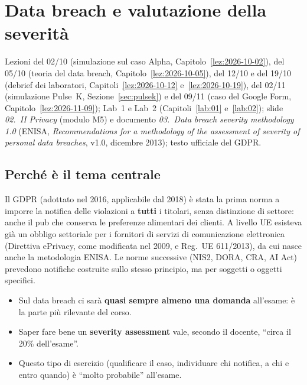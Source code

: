 \chapter{Data breach e valutazione della severità}
\label{cap:data-breach}

\begin{nota}[Fonti]
Lezioni del 02/10 (simulazione sul caso Alpha, Capitolo~\ref{lez:2026-10-02}), del 05/10 (teoria del
data breach, Capitolo~\ref{lez:2026-10-05}), del 12/10 e del 19/10 (debrief dei laboratori,
Capitoli~\ref{lez:2026-10-12} e~\ref{lez:2026-10-19}), del 02/11 (simulazione Pulse~K,
Sezione~\ref{sec:pulsek}) e del 09/11 (caso del Google Form, Capitolo~\ref{lez:2026-11-09}); Lab~1 e
Lab~2 (Capitoli~\ref{lab:01} e~\ref{lab:02}); slide \emph{02.~II Privacy} (modulo M5) e documento
\emph{03.~Data breach severity methodology 1.0} (ENISA, \emph{Recommendations for a methodology of the
assessment of severity of personal data breaches}, v1.0, dicembre 2013); testo ufficiale del GDPR.
\end{nota}

\section{Perché è il tema centrale}
\label{sec:breach-perche}

Il GDPR (adottato nel 2016, applicabile dal 2018) è stata la prima norma a imporre la notifica delle
violazioni a \textbf{tutti} i titolari, senza distinzione di settore: anche il pub che conserva le
preferenze alimentari dei clienti. A livello UE esisteva già un obbligo settoriale per i fornitori di
servizi di comunicazione elettronica (Direttiva ePrivacy, come modificata nel 2009, e Reg.~UE 611/2013), da cui
nasce anche la metodologia ENISA. Le norme successive (NIS2, DORA, CRA, AI Act) prevedono notifiche
costruite sullo stesso principio, ma per soggetti o oggetti specifici.

\begin{esame}
\begin{itemize}
  \item Sul data breach ci sarà \textbf{quasi sempre almeno una domanda} all'esame: è la parte più
    rilevante del corso.
  \item Saper fare bene un \textbf{severity assessment} vale, secondo il docente, ``circa il 20\%
    dell'esame''.
  \item Questo tipo di esercizio (qualificare il caso, individuare chi notifica, a chi e entro quando) è
    ``molto probabile'' all'esame.
\end{itemize}
\end{esame}

